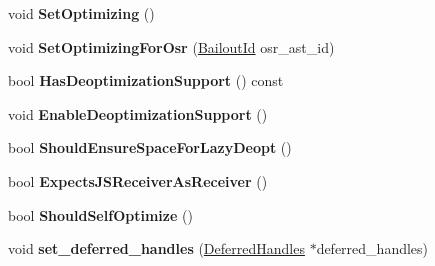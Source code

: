 \begin{DoxyCompactItemize}
\item 
void {\bfseries Set\+Optimizing} ()\hypertarget{classv8_1_1internal_1_1_compilation_info_a5029d443707e9687a248031c5fb1c8cd}{}\label{classv8_1_1internal_1_1_compilation_info_a5029d443707e9687a248031c5fb1c8cd}

\item 
void {\bfseries Set\+Optimizing\+For\+Osr} (\hyperlink{classv8_1_1internal_1_1_bailout_id}{Bailout\+Id} osr\+\_\+ast\+\_\+id)\hypertarget{classv8_1_1internal_1_1_compilation_info_a230c0eb1d0ef32225eaac0cdd8d7115a}{}\label{classv8_1_1internal_1_1_compilation_info_a230c0eb1d0ef32225eaac0cdd8d7115a}

\item 
bool {\bfseries Has\+Deoptimization\+Support} () const \hypertarget{classv8_1_1internal_1_1_compilation_info_ae22ffec25c42c1f64eb0d72dea45c6ea}{}\label{classv8_1_1internal_1_1_compilation_info_ae22ffec25c42c1f64eb0d72dea45c6ea}

\item 
void {\bfseries Enable\+Deoptimization\+Support} ()\hypertarget{classv8_1_1internal_1_1_compilation_info_a2a6e12c34281ac4239fa5a40ea4b5a53}{}\label{classv8_1_1internal_1_1_compilation_info_a2a6e12c34281ac4239fa5a40ea4b5a53}

\item 
bool {\bfseries Should\+Ensure\+Space\+For\+Lazy\+Deopt} ()\hypertarget{classv8_1_1internal_1_1_compilation_info_a41cc1293521fe1e3cabc68a0d39a04c2}{}\label{classv8_1_1internal_1_1_compilation_info_a41cc1293521fe1e3cabc68a0d39a04c2}

\item 
bool {\bfseries Expects\+J\+S\+Receiver\+As\+Receiver} ()\hypertarget{classv8_1_1internal_1_1_compilation_info_a5a63ff3e28af34bfe6040e4978fad73a}{}\label{classv8_1_1internal_1_1_compilation_info_a5a63ff3e28af34bfe6040e4978fad73a}

\item 
bool {\bfseries Should\+Self\+Optimize} ()\hypertarget{classv8_1_1internal_1_1_compilation_info_a3a2d1b5893b3341ab37f1cc7b043bb7b}{}\label{classv8_1_1internal_1_1_compilation_info_a3a2d1b5893b3341ab37f1cc7b043bb7b}

\item 
void {\bfseries set\+\_\+deferred\+\_\+handles} (\hyperlink{classv8_1_1internal_1_1_deferred_handles}{Deferred\+Handles} $\ast$deferred\+\_\+handles)\hypertarget{classv8_1_1internal_1_1_compilation_info_af28c1f04691ebb55c5d6bd6e963bf073}{}\label{classv8_1_1internal_1_1_compilation_info_af28c1f04691ebb55c5d6bd6e963bf073}


\end{DoxyCompactItemize}
